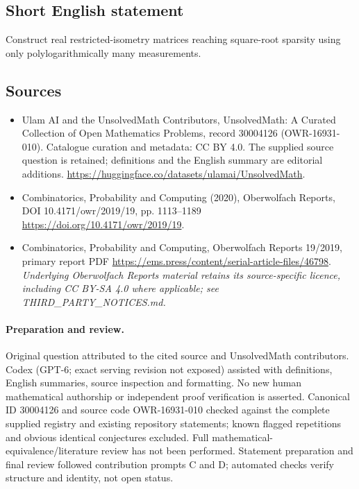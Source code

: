 \documentclass[11pt]{article}
\begin{document}
\subsection{Short English statement}
Construct real restricted-isometry matrices reaching square-root sparsity using only polylogarithmically many measurements.
\subsection{Sources}
\begin{itemize}
\item[\hypertarget{source:30004126:1}{S1}] Ulam AI and the UnsolvedMath Contributors, UnsolvedMath: A Curated Collection of Open Mathematics Problems, record 30004126 (OWR-16931-010). Catalogue curation and metadata: CC BY 4.0. The supplied source question is retained; definitions and the English summary are editorial additions.
\url{https://huggingface.co/datasets/ulamai/UnsolvedMath}.
\item[\hypertarget{source:30004126:2}{S2}] Combinatorics, Probability and Computing (2020), Oberwolfach Reports, DOI 10.4171/owr/2019/19, pp. 1113--1189
\url{https://doi.org/10.4171/owr/2019/19}.
\item[\hypertarget{source:30004126:3}{S3}] Combinatorics, Probability and Computing, Oberwolfach Reports 19/2019, primary report PDF
\url{https://ems.press/content/serial-article-files/46798}.
\textit{Underlying Oberwolfach Reports material retains its source-specific licence, including CC BY-SA 4.0 where applicable; see THIRD\_PARTY\_NOTICES.md.}
\end{itemize}
\paragraph{Preparation and review.}
Original question attributed to the cited source and UnsolvedMath contributors. Codex (GPT-6; exact serving revision not exposed) assisted with definitions, English summaries, source inspection and formatting. No new human mathematical authorship or independent proof verification is asserted. Canonical ID 30004126 and source code OWR-16931-010 checked against the complete supplied registry and existing repository statements; known flagged repetitions and obvious identical conjectures excluded. Full mathematical-equivalence/literature review has not been performed. Statement preparation and final review followed contribution prompts C and D; automated checks verify structure and identity, not open status.
\label{end:30004126}
\end{document}
